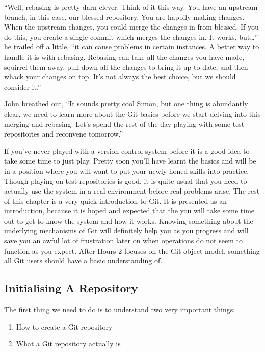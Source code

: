 \begin{trenches}
``Well, rebasing is pretty darn clever. Think of it this way. You have an upstream branch, in this case, our blessed repository. You are happily making changes. When the upstream changes, you could merge the changes in from blessed. If you do this, you create a single commit which merges the changes in. It works, but\ldots'' he trailed off a little,
``it can cause problems in certain instances. A better way to handle it is with rebasing. Rebasing can take all the changes you have made, squirrel them away, pull down all the changes to bring it up to date, and then whack your changes on top.
It's not always the best choice, but we should consider it.''

John breathed out, ``It sounds pretty cool Simon, but one thing is abundantly clear, we need to learn more about the Git basics before we start delving into this merging and rebasing. Let's spend the rest of the day playing with some test repositories and reconvene tomorrow.''
\end{trenches}

If you've never played with a version control system before it is a good idea to take some time to just play.
Pretty soon you'll have learnt the basics and will be in a position where you will want to put your newly honed skills into practice.
Though playing on test repositories is good, it is quite usual that you need to actually use the system in a real environment before real problems arise.
The rest of this chapter is a very quick introduction to Git.
It is presented as an introduction, because it is hoped and expected that the you will take some time out to get to know the system and how it works.
Knowing something about the underlying mechanisms of Git will definitely help you as you progress and will save you an awful lot of frustration later on when operations do not seem to function as you expect.
After Hours 2 focuses on the Git object model, something all Git users should have a basic understanding of.

\subsection{Initialising A Repository}
The first thing we need to do is to understand two very important things:

\begin{enumerate}
  \item How to create a Git repository
  \item What a Git repository actually is
\end{enumerate}

